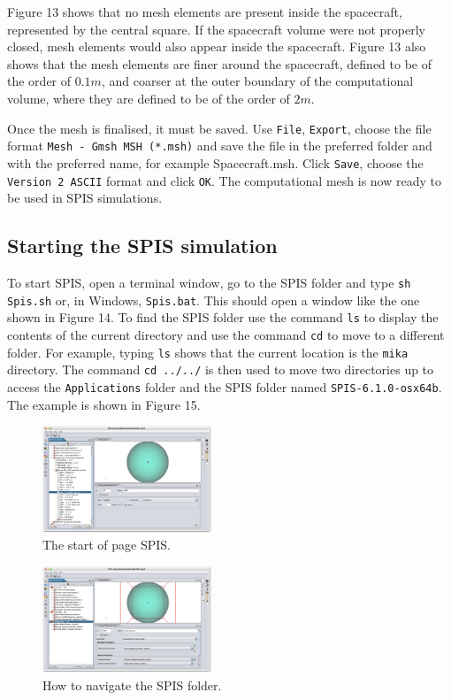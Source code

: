 \documentclass[a4paper, 11pt]{article}
\begin{document}
Figure 13 shows that no mesh elements are present inside the spacecraft, represented by the central square. If the spacecraft volume were not properly closed, mesh elements would also appear inside the spacecraft. Figure 13 also shows that the mesh elements are finer around the spacecraft, defined to be of the order of $0.1 \si{m}$, and coarser at the outer boundary of the computational volume, where they are defined to be of the order of $2 \si{m}$.\par
Once the mesh is finalised, it must be saved. Use \verb|File|, \verb|Export|, choose the file format \verb|Mesh - Gmsh MSH (*.msh)| and save the file in the preferred folder and with the preferred name, for example Spacecraft.msh. Click \verb|Save|, choose the \verb|Version 2 ASCII| format and click \verb|OK|. The computational mesh is now ready to be used in SPIS simulations.

\subsection{Starting the SPIS simulation}

To start SPIS, open a terminal window, go to the SPIS folder and type \verb|sh Spis.sh| or, in Windows, \verb|Spis.bat|. This should open a window like the one shown in Figure 14. To find the SPIS folder use the command \verb|ls| to display the contents of the current directory and use the command \verb|cd| to move to a different folder. For example, typing \verb|ls| shows that the current location is the \verb|mika| directory. The command \verb|cd ../../| is then used to move two directories up to access the \verb|Applications| folder and the SPIS folder named \verb|SPIS-6.1.0-osx64b|. The example is shown in Figure 15.

\begin{figure}[!ht]
    \centering
    \includegraphics[width=0.45\textwidth]{fig14.jpg}
    \caption{The start of page SPIS.}
\end{figure}

\begin{figure}[!ht]
    \centering
    \includegraphics[width=0.45\textwidth]{fig15.jpg}
    \caption{How to navigate the SPIS folder.}
\end{figure}
\end{document}
